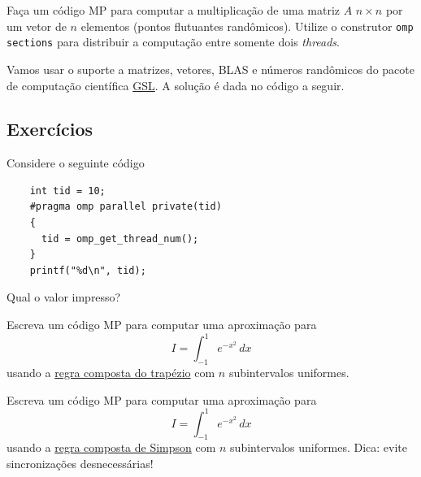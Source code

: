 \begin{exeresol}\label{exeresol:cc_AxSecoes}
  Faça um código MP para computar a multiplicação de uma matriz $A$ $n\times n$ por um vetor de $n$ elementos (pontos flutuantes randômicos). Utilize o construtor \verb+omp sections+ para distribuir a computação entre somente dois {\it threads}.
\end{exeresol}
\begin{resol}
  Vamos usar o suporte a matrizes, vetores, BLAS e números randômicos do pacote de computação científica \href{https://www.gnu.org/software/gsl/}{GSL}. A solução é dada no código a seguir.

  
\end{resol}

\subsection*{Exercícios}

\begin{exer}
  Considere o seguinte código
  \begin{lstlisting}
    int tid = 10;
    #pragma omp parallel private(tid)
    {
      tid = omp_get_thread_num();
    }
    printf("%d\n", tid);
  \end{lstlisting}
  Qual o valor impresso?
\end{exer}

\begin{exer}\label{exer:cc_trap}
  Escreva um código MP para computar uma aproximação para
  \begin{equation}
    I = \int_{-1}^{1} e^{-x^2}\,dx
  \end{equation}
  usando a \href{https://phkonzen.github.io/notas/MatematicaNumerica/cap_integr_sec_int_comp.html}{regra composta do trapézio} com $n$ subintervalos uniformes.
\end{exer}

\begin{exer}\label{exer:cc_simp}
  Escreva um código MP para computar uma aproximação para
  \begin{equation}
    I = \int_{-1}^{1} e^{-x^2}\,dx
  \end{equation}
  usando a \href{https://phkonzen.github.io/notas/MatematicaNumerica/cap_integr_sec_int_comp.html}{regra composta de Simpson} com $n$ subintervalos uniformes. Dica: evite sincronizações desnecessárias!
\end{exer}


